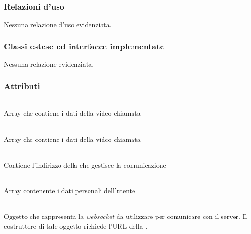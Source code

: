 \subsubsection*{Relazioni d'uso}
Nessuna relazione d'uso evidenziata.

\subsubsection*{Classi estese ed interfacce implementate}
Nessuna relazione evidenziata.

\subsubsection*{Attributi}
\begin{description}
\item{}\\
Array che contiene i dati della video-chiamata
\item{}\\
Array che contiene i dati della video-chiamata
\item{}\\
Contiene l'indirizzo della  che gestisce la comunicazione
\item{}\\
Array contenente i dati personali dell'utente
\item{}\\
Oggetto che rappresenta la \textit{websocket} da utilizzare per comunicare con il server. Il costruttore di tale oggetto richiede l'URL della .

\end{description}

